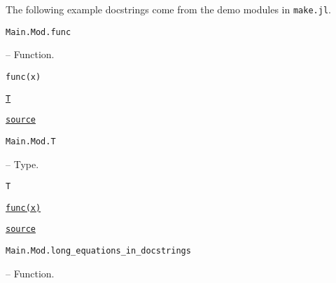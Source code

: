 \label{4859465668994674752}{}


The following example docstrings come from the demo modules in \texttt{make.jl}.


\hypertarget{5669384191785722396}{\texttt{Main.Mod.func}}  -- {Function.}

\begin{adjustwidth}{2em}{0pt}


\begin{verbatim}
func(x)
\end{verbatim}

\href{@ref}{\texttt{T}}



\href{https://example.org/Repository.jl/blob/test/examples/make.jl#L27-31}{\texttt{source}}


\end{adjustwidth}
\hypertarget{1885743281855441478}{\texttt{Main.Mod.T}}  -- {Type.}

\begin{adjustwidth}{2em}{0pt}


\begin{verbatim}
T
\end{verbatim}

\href{@ref}{\texttt{func(x)}}



\href{https://example.org/Repository.jl/blob/test/examples/make.jl#L34-38}{\texttt{source}}


\end{adjustwidth}
\hypertarget{15818938160560313688}{\texttt{Main.Mod.long\_equations\_in\_docstrings}}  -- {Function.}

